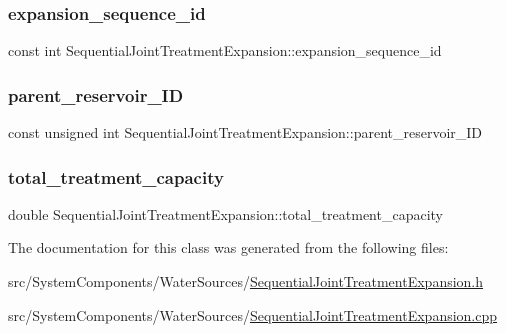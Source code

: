 \subsubsection{\texorpdfstring{expansion\+\_\+sequence\+\_\+id}{expansion\_sequence\_id}}
{\footnotesize\ttfamily const int Sequential\+Joint\+Treatment\+Expansion\+::expansion\+\_\+sequence\+\_\+id}

\mbox{\label{classSequentialJointTreatmentExpansion_a43b9e27138606bbbf8e5ef0279232a0a_a43b9e27138606bbbf8e5ef0279232a0a}} 
\subsubsection{\texorpdfstring{parent\+\_\+reservoir\+\_\+\+ID}{parent\_reservoir\_ID}}
{\footnotesize\ttfamily const unsigned int Sequential\+Joint\+Treatment\+Expansion\+::parent\+\_\+reservoir\+\_\+\+ID}

\mbox{\label{classSequentialJointTreatmentExpansion_a35db39c86948882acbc30fe970f55d52_a35db39c86948882acbc30fe970f55d52}} 
\subsubsection{\texorpdfstring{total\+\_\+treatment\+\_\+capacity}{total\_treatment\_capacity}}
{\footnotesize\ttfamily double Sequential\+Joint\+Treatment\+Expansion\+::total\+\_\+treatment\+\_\+capacity\hspace{0.3cm}{\ttfamily [private]}}



The documentation for this class was generated from the following files\+:\begin{DoxyCompactItemize}
\item 
src/\+System\+Components/\+Water\+Sources/\mbox{\hyperlink{SequentialJointTreatmentExpansion_8h}{Sequential\+Joint\+Treatment\+Expansion.\+h}}\item 
src/\+System\+Components/\+Water\+Sources/\mbox{\hyperlink{SequentialJointTreatmentExpansion_8cpp}{Sequential\+Joint\+Treatment\+Expansion.\+cpp}}\end{DoxyCompactItemize}
